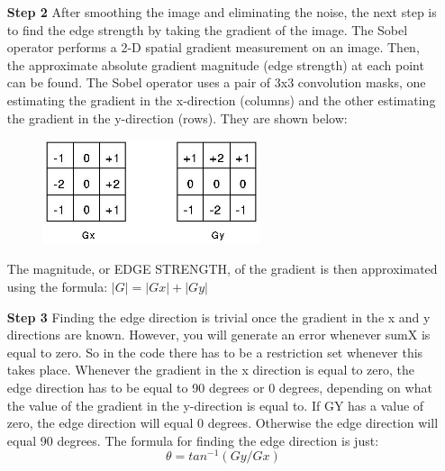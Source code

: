\begin{enumerate}
\item[\textbf{Step 2}]After smoothing the image and eliminating the noise, the next step is to find the edge strength by taking the gradient of the image. The Sobel operator performs a 2-D spatial gradient measurement on an image. Then, the approximate absolute gradient magnitude (edge strength) at each point can be found. The Sobel operator uses a pair of 3x3 convolution masks, one estimating the gradient in the x-direction (columns) and the other estimating the gradient in the y-direction (rows). They are shown below:
\begin{figure}[H]
\centering
\label{fig:Mask} 
\includegraphics[width=0.6\textwidth]{Mask}
\end{figure}
The magnitude, or EDGE STRENGTH, of the gradient is then approximated using the formula: $|G| = |Gx| + |Gy|$
\item[\textbf{Step 3}]Finding the edge direction is trivial once the gradient in the x and y directions are known. However, you will generate an error whenever sumX is equal to zero. So in the code there has to be a restriction set whenever this takes place. Whenever the gradient in the x direction is equal to zero, the edge direction has to be equal to 90 degrees or 0 degrees, depending on what the value of the gradient in the y-direction is equal to. If GY has a value of zero, the edge direction will equal 0 degrees. Otherwise the edge direction will equal 90 degrees. The formula for finding the edge direction is just: $$\theta = tan^{-1} (Gy / Gx)$$


\end{enumerate}
